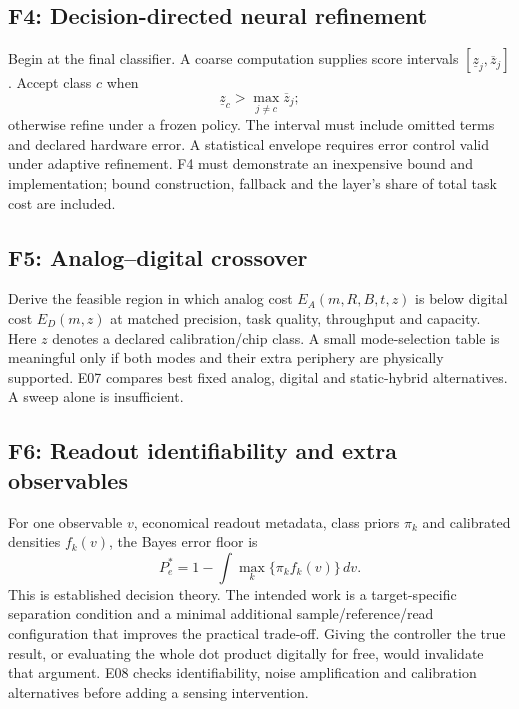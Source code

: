 \subsection{F4: Decision-directed neural refinement}

Begin at the final classifier. A coarse computation supplies score intervals
$[\underline z_j,\overline z_j]$. Accept class $c$ when
\begin{equation}
 \underline z_c>\max_{j\ne c}\overline z_j;
\end{equation}
otherwise refine under a frozen policy. The interval must include omitted terms and
declared hardware error. A statistical envelope requires error control valid under
adaptive refinement. F4 must demonstrate an inexpensive bound and implementation;
bound construction, fallback and the layer's share of total task cost are included.

\subsection{F5: Analog--digital crossover}

Derive the feasible region in which analog cost $E_A(m,R,B,t,z)$ is below digital cost
$E_D(m,z)$ at matched precision, task quality, throughput and capacity. Here $z$ denotes
a declared calibration/chip class. A small mode-selection table is meaningful only if
both modes and their extra periphery are physically supported. E07 compares best fixed
analog, digital and static-hybrid alternatives. A sweep alone is insufficient.

\subsection{F6: Readout identifiability and extra observables}

For one observable $v$, economical readout metadata, class priors $\pi_k$ and calibrated
densities $f_k(v)$, the Bayes error floor is
\begin{equation}
 P_e^*=1-\int\max_k\{\pi_k f_k(v)\}\,dv.
\end{equation}
This is established decision theory. The intended work is a target-specific separation
condition and a minimal additional sample/reference/read configuration that improves
the practical trade-off. Giving the controller the true result, or evaluating the whole
dot product digitally for free, would invalidate that argument. E08 checks identifiability,
noise amplification and calibration alternatives before adding a sensing intervention.

